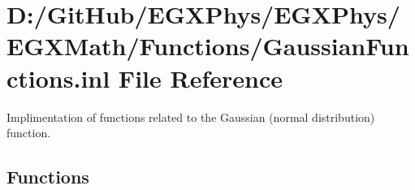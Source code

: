 \hypertarget{_gaussian_functions_8inl}{}\section{D\+:/\+Git\+Hub/\+E\+G\+X\+Phys/\+E\+G\+X\+Phys/\+E\+G\+X\+Math/\+Functions/\+Gaussian\+Functions.inl File Reference}
\label{_gaussian_functions_8inl}


Implimentation of functions related to the Gaussian (normal distribution) function.  


\subsection*{Functions}
